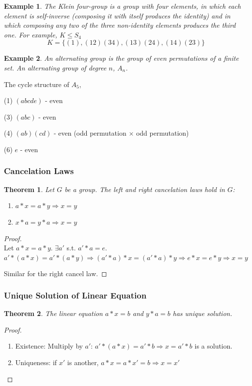 \documentclass[11pt,a4paper]{article}
\newtheorem{theorem}{Theorem}
\newtheorem{example}{Example}
\begin{document}
\begin{example}
    The Klein four-group is a group with four elements, in which each element is self-inverse (composing it with itself produces the identity) and in which composing any two of the three non-identity elements produces the third one. For example, $K\leq S_4$
    $$K=\{(1),(12)(34),(13)(24),(14)(23)\}$$
\end{example}

\begin{example}
    An alternating group is the group of even permutations of a finite set. An alternating group of degree $n$, $A_n$.
\end{example}
The cycle structure of $A_5$,

(1) $(a b c d e)$ - even

(3) $(a b c)$ - even

(4) $(a b)(c d)$ - even (odd permutation $\times$ odd permutation)

(6) $e$ - even



\subsubsection{Cancelation Laws}
\begin{theorem}
Let $G$ be a group. The left and right cancelation laws hold in $G$:
\begin{enumerate}
    \item $a*x=a*y \Rightarrow x=y$
    \item $x*a=y*a \Rightarrow x=y$
\end{enumerate}
\end{theorem}
\begin{proof}
\quad\\
Let $a*x=a*y$. $\exists a'$ s.t. $a'*a=e$. $a'*(a*x)=a'*(a*y) \Rightarrow (a'*a)*x=(a'*a)*y \Rightarrow	e*x=e*y \Rightarrow	x=y$

Similar for the right cancel law.
\end{proof}

\subsubsection{Unique Solution of Linear Equation}
\begin{theorem}
The linear equation $a*x=b$ and $y*a=b$ has unique solution.
\end{theorem}
\begin{proof}
\quad\\
\begin{enumerate}
    \item Existence: Multiply by $a'$: $a'*(a*x)=a'*b \Rightarrow x=a'*b$ is a solution.
    \item Uniqueness: if $x'$ is another, $a*x=a*x'=b \Rightarrow x=x'$
\end{enumerate}
\end{proof}
\end{document}
